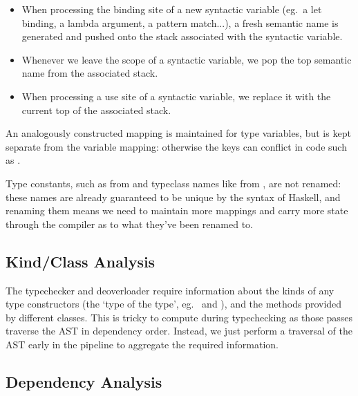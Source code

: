 \documentclass[dissertation.tex]{subfiles}
\begin{document}
{{{            \begin{itemize}
            \item When processing the binding site of a new syntactic variable (eg.\ a let binding, a lambda argument, a
            pattern match...), a fresh semantic name is generated and pushed onto the stack associated with the
            syntactic variable.
            \item Whenever we leave the scope of a syntactic variable, we pop the top semantic name from the associated
            stack.
            \item When processing a use site of a syntactic variable, we replace it with the current top of the
            associated stack.
            \end{itemize}

            An analogously constructed mapping is maintained for type variables, but is kept separate from the variable
            mapping: otherwise the keys can conflict in code such as .

            Type constants, such as  from  and typeclass names like
             from , are not renamed: these names are already guaranteed to
            be unique by the syntax of Haskell, and renaming them means we need to maintain more mappings and carry more
            state through the compiler as to what they've been renamed to.

        }
        \subsection{Kind/Class Analysis}
        {

            The typechecker and deoverloader require information about the kinds of any type constructors (the `type of
            the type', eg.\  and ), and the methods provided by different
            classes. This is tricky to compute during typechecking as those passes traverse the AST in dependency order.
            Instead, we just perform a traversal of the AST early in the pipeline to aggregate the required information.

        }
        \subsection{Dependency Analysis}
        {

}}}
\end{document}
